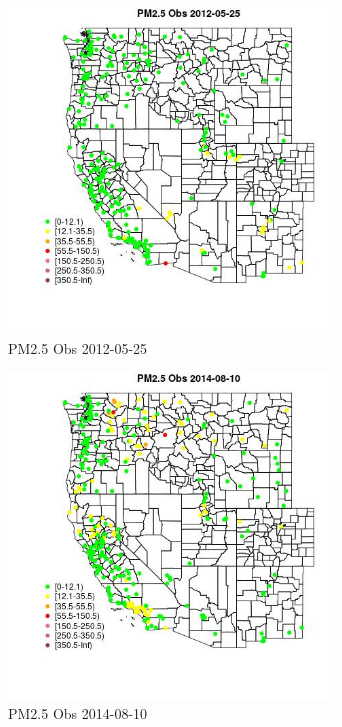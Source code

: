 \begin{figure} 
\centering  
\includegraphics[width=0.77\textwidth]{Code_Outputs/Report_ML_input_PM25_Step4_part_e_de_duplicated_aves_compiled_2019-05-18wNAs_MapObsPM25_Obs2012-05-25.jpg} 
\caption{\label{fig:Report_ML_input_PM25_Step4_part_e_de_duplicated_aves_compiled_2019-05-18wNAsMapObsPM25_Obs2012-05-25}PM2.5 Obs 2012-05-25} 
\end{figure} 
 

\begin{figure} 
\centering  
\includegraphics[width=0.77\textwidth]{Code_Outputs/Report_ML_input_PM25_Step4_part_e_de_duplicated_aves_compiled_2019-05-18wNAs_MapObsPM25_Obs2014-08-10.jpg} 
\caption{\label{fig:Report_ML_input_PM25_Step4_part_e_de_duplicated_aves_compiled_2019-05-18wNAsMapObsPM25_Obs2014-08-10}PM2.5 Obs 2014-08-10} 
\end{figure} 
 

